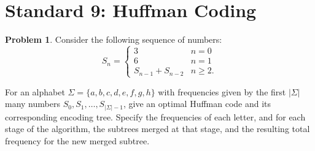 \documentclass[11pt]{article}
\theoremstyle{definition}
\theoremstyle{definition}
\newtheorem{required}{Problem}
\theoremstyle{definition}
\begin{document}
\section{Standard 9: Huffman Coding}
\begin{required}
Consider the following sequence of numbers:
\[
S_n = \begin{cases}
3 & n = 0 \\
6 & n = 1 \\
S_{n-1} + S_{n-2} & n \geq 2.
\end{cases}
\]

For an alphabet $\Sigma = \{a,b,c,d,e,f,g,h\}$ with frequencies given by the first $|\Sigma|$ many numbers $S_0, S_1, \dotsc, S_{|\Sigma|-1}$, give an optimal Huffman code and its corresponding encoding tree. Specify the frequencies of each letter, and for each stage of the algorithm, the subtrees merged at that stage, and the resulting total frequency for the new merged subtree.
\end{required}
\end{document}
